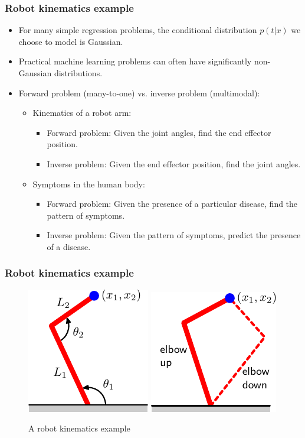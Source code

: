 \documentclass{beamer}
\begin{document}
\begin{frame}
    \frametitle{Robot kinematics example}
    \begin{itemize}
        \item For many simple regression problems, the conditional distribution $p(t|x)$ we choose to model is Gaussian.
        \item Practical machine learning problems can often have significantly non-Gaussian distributions.
        \item Forward problem (many-to-one) vs. inverse problem (multimodal):
        \begin{itemize}
            \item Kinematics of a robot arm:
            \begin{itemize}
                \item Forward problem: Given the joint angles, find the end effector position.
                \item Inverse problem: Given the end effector position, find the joint angles.
            \end{itemize}
            \item Symptoms in the human body:
            \begin{itemize}
                \item Forward problem: Given the presence of a particular disease, find the pattern of symptoms.
                \item Inverse problem: Given the pattern of symptoms, predict the presence of a disease.
            \end{itemize}
        \end{itemize}
    \end{itemize}
\end{frame}

\begin{frame}
    \frametitle{Robot kinematics example}
    \begin{figure}
        \caption{A robot kinematics example}
        \includegraphics{Figure_16_a.pdf}
        \includegraphics{Figure_16_b.pdf}
    \end{figure}
\end{frame}
\end{document}
